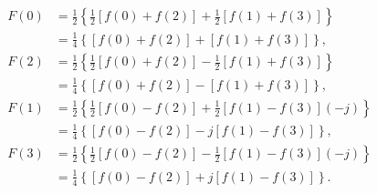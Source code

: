 \begin{align}
F(0) &= \frac{1}{2} 
  \left \{ 
    \frac{1}{2} \left [ f(0) + f(2) \right ] + \frac{1}{2} \left [ f(1) + f(3) \right ]
  \right \} \nonumber \\
     &= \frac{1}{4}
  \left \{ 
    \left [ f(0) + f(2) \right ] + \left [ f(1) + f(3) \right ]
  \right \}
\textrm{,}\\
F(2) &= \frac{1}{2} 
  \left \{ 
    \frac{1}{2} \left [ f(0) + f(2) \right ] - \frac{1}{2} \left [ f(1) + f(3) \right ]
  \right \} \nonumber \\
     &= \frac{1}{4}
  \left \{ 
    \left [ f(0) + f(2) \right ] - \left [ f(1) + f(3) \right ]
  \right \}
\textrm{,}\\
F(1) &= \frac{1}{2} 
  \left \{ 
    \frac{1}{2} \left [ f(0) - f(2) \right ] + \frac{1}{2} \left [ f(1) - f(3) \right ] (-j)
  \right \} \nonumber \\
     &= \frac{1}{4}
  \left \{ 
    \left [ f(0) - f(2) \right ] - j \left [ f(1) - f(3) \right ]
  \right \}
\textrm{,}\\
F(3) &= \frac{1}{2} 
  \left \{ 
    \frac{1}{2} \left [ f(0) - f(2) \right ] - \frac{1}{2} \left [ f(1) - f(3) \right ] (-j)
  \right \} \nonumber \\
     &= \frac{1}{4}
  \left \{ 
    \left [ f(0) - f(2) \right ] + j \left [ f(1) - f(3) \right ]
  \right \}
\textrm{.}
\end{align}
